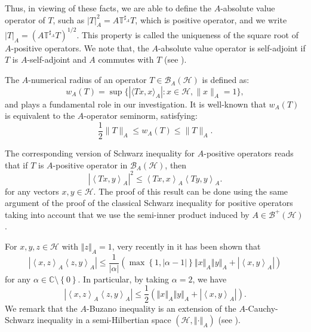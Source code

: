 \documentclass{article}
\newcommand{\bra}[1]{\left(#1\right)}
\newcommand{\seqA}[1]{{\left<#1\right>}_{A}}
\newcommand{\normA}[1]{{\left\Vert#1\right\Vert}_{A}}
\newcommand{\abs}[1]{\left\vert#1\right\vert}
\newcommand{\set}[1]{\left\{#1\right\}}
\renewcommand{\c}{\mathbb C}
\newcommand {\h}{\mathcal{H}}
\newcommand {\Ta}{\mathbb{T}^{\sharp_{A}}}
\renewcommand {\b}{\mathcal{B}}
\begin{document}
 Thus, in viewing of these
facts, we are able to define the $A$-absolute value operator of $T$, such as $|T|_A^2=A\Ta T$, which is positive
operator, and we write $|T|_A=\bra{A\Ta T}^{1/2}$. This property is called the uniqueness of the square root of
$A$-positive operators. We note that, the $A$-absolute value operator is self-adjoint if $T$ is $A$-self-adjoint and $A$
commutes with $T$ (see \cite{Alomari}).




The $A$-numerical radius of an operator $T \in \mathcal{B}_A(\mathcal{H})$ is defined as:
\[
w_A(T) = \sup \{ |\langle Tx,x \rangle_A| : x \in \mathcal{H}, \|x\|_A = 1 \},
\]
and plays a fundamental role in our investigation. It is well-known that $w_A(T)$ is equivalent to the $A$-operator seminorm, satisfying:
\[
\frac{1}{2}\|T\|_A \leq w_A(T) \leq \|T\|_A.
\]

The corresponding version of Schwarz inequality for $A$-positive operators reads that if $T$ is $A$-positive
operator in $\b_A(\h)$, then
\begin{equation}\label{CS}
  \abs{\seqA{Tx,y}}^2\leq \seqA{Tx,x}\seqA{Ty,y}.
\end{equation}
for any vectors $x,y\in\h$. The proof of this result can be done using the same argument of the proof of the
classical Schwarz inequality for positive operators taking into account that we use the semi-inner product
induced by $A\in\b^+(\h)$.

 For $x,y,z\in\h$ with $\normA{z}=1$,  very recently in \cite{KZ}
it has been shown that
\begin{equation}\label{Buz1}
  \abs{\seqA{x,z}\seqA{z,y}}\leq \frac{1}{\abs{\alpha}}\bra{\max\set{1,\abs{\alpha-1}}\normA{x}\normA{y}+\abs{\seqA{x,y}}}
\end{equation}
for any $\alpha\in\c\setminus\set{0}$. In particular, by taking $\alpha=2$, we have
\begin{equation}\label{Buz2}
  \abs{\seqA{x,z}\seqA{z,y}}\leq \frac{1}{2}\bra{\normA{x}\normA{y}+\abs{\seqA{x,y}}}.
\end{equation}
We remark that the $A$-Buzano inequality is an extension of the $A$-Cauchy-Schwarz inequality in a semi-Hilbertian space
$(\h,\normA{\cdot})$ (see \cite{KZ}).



\end{document}
